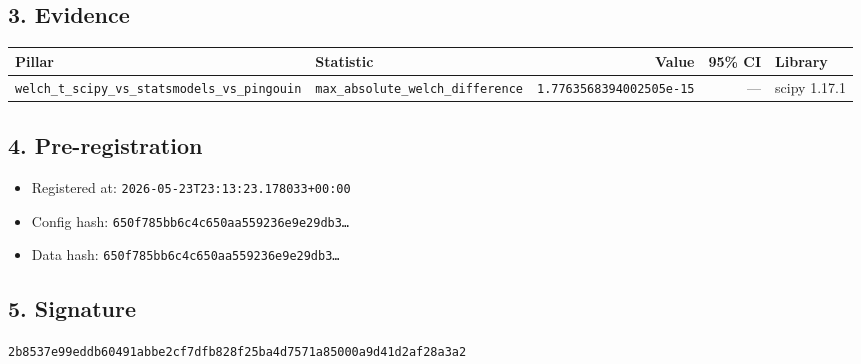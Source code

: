 \documentclass{article}
\begin{document}
\subsection*{3. Evidence}
\begin{tabular}{llrrl}\toprule
\textbf{Pillar} & \textbf{Statistic} & \textbf{Value} & \textbf{95\% CI} & \textbf{Library} \\\midrule
\texttt{welch\_t\_scipy\_vs\_statsmodels\_vs\_pingouin} & \texttt{max\_absolute\_welch\_difference} & \texttt{1.7763568394002505e-15} & --- & scipy 1.17.1 \\
\bottomrule\end{tabular}
\subsection*{4. Pre-registration}
\begin{itemize}
\item Registered at: \texttt{2026-05-23T23:13:23.178033+00:00}
\item Config hash: \texttt{650f785bb6c4c650aa559236e9e29db3\dots}
\item Data hash: \texttt{650f785bb6c4c650aa559236e9e29db3\dots}
\end{itemize}
\subsection*{5. Signature}
\texttt{2b8537e99eddb60491abbe2cf7dfb828f25ba4d7571a85000a9d41d2af28a3a2}\\
\end{document}

